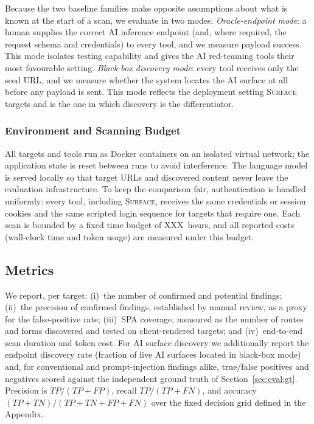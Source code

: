 Because the two baseline families make opposite assumptions about what is known
at the start of a scan, we evaluate in two modes.
\emph{Oracle-endpoint mode}: a human supplies the correct AI inference endpoint
(and, where required, the request schema and credentials) to every tool, and we
measure payload success. This mode isolates testing capability and gives the AI
red-teaming tools their most favourable setting.
\emph{Black-box discovery mode}: every tool receives only the seed URL, and we
measure whether the system locates the AI surface at all before any payload is
sent. This mode reflects the deployment setting \textsc{Surface} targets and is
the one in which discovery is the differentiator.

\subsubsection{Environment and Scanning Budget}
\label{sec:eval:env}

All targets and tools run as Docker containers on an isolated virtual network;
the application state is reset between runs to avoid interference. The language
model is served locally so that target URLs and discovered content never leave
the evaluation infrastructure. To keep the comparison fair, authentication is
handled uniformly: every tool, including \textsc{Surface}, receives the same
credentials or session cookies and the same scripted login sequence for targets
that require one. Each scan is bounded by a fixed time budget of
\textsc{XXX}~hours, and all reported costs (wall-clock time and token usage) are
measured under this budget.

\subsection{Metrics}
\label{sec:eval:metrics}

We report, per target: (i)~the number of confirmed and potential findings;
(ii)~the precision of confirmed findings, established by manual review, as a
proxy for the false-positive rate; (iii)~SPA coverage, measured as the number
of routes and forms discovered and tested on client-rendered targets; and
(iv)~end-to-end scan duration and token cost. For AI surface discovery we
additionally report the endpoint discovery rate (fraction of live AI surfaces
located in black-box mode) and, for conventional and prompt-injection findings
alike, true/false positives and negatives scored against the independent ground
truth of Section~\ref{sec:eval:gt}. Precision is $\mathit{TP}/(\mathit{TP}+
\mathit{FP})$, recall $\mathit{TP}/(\mathit{TP}+\mathit{FN})$, and accuracy
$(\mathit{TP}+\mathit{TN})/(\mathit{TP}+\mathit{TN}+\mathit{FP}+\mathit{FN})$
over the fixed decision grid defined in the Appendix.

